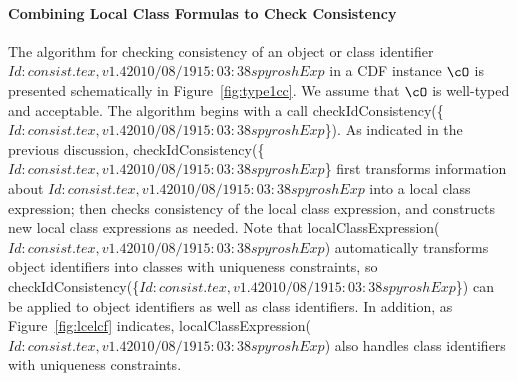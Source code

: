 \paragraph*{Combining Local Class Formulas to Check Consistency}
The algorithm for checking consistency of an object or class
identifier $Id: consist.tex,v 1.4 2010/08/19 15:03:38 spyrosh Exp $ in a CDF instance $\cO$ is presented schematically in
Figure~\ref{fig:type1cc}.  We assume that $\cO$ is well-typed and
acceptable.  The algorithm begins with a call {\sf
checkIdConsistency(\{$Id: consist.tex,v 1.4 2010/08/19 15:03:38 spyrosh Exp $\})}.  As indicated in the previous
discussion, {\sf checkIdConsistency(\{$Id: consist.tex,v 1.4 2010/08/19 15:03:38 spyrosh Exp $\}} first transforms
information about $Id: consist.tex,v 1.4 2010/08/19 15:03:38 spyrosh Exp $ into a local class expression; then checks
consistency of the local class expression, and constructs new local
class expressions as needed.  Note that {\sf
localClassExpression($Id: consist.tex,v 1.4 2010/08/19 15:03:38 spyrosh Exp $)} automatically transforms object
identifiers into classes with uniqueness constraints, so {\sf
checkIdConsistency(\{$Id: consist.tex,v 1.4 2010/08/19 15:03:38 spyrosh Exp $\})} can be applied to object identifiers as
well as class identifiers.  In addition, as Figure~\ref{fig:lcelcf}
indicates, {\sf localClassExpression($Id: consist.tex,v 1.4 2010/08/19 15:03:38 spyrosh Exp $)} also handles class
identifiers with uniqueness constraints.

